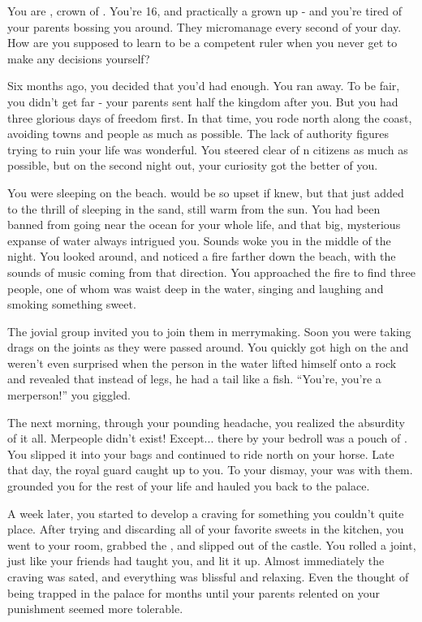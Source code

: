 \documentclass[char]{NeptuneBall}
\begin{document}
\name{\cWillow{}}
%

You are \cWillow{}, crown \cWillow{\prince} of \pAmerica{}. You're 16, and practically a grown up - and you're tired of your parents bossing you around. They micromanage every second of your day. How are you supposed to learn to be a competent ruler when you never get to make any decisions yourself?

Six months ago, you decided that you'd had enough. You ran away. To be fair, you didn't get far - your parents sent half the kingdom after you. But you had three glorious days of freedom first. In that time, you rode north along the coast, avoiding towns and people as much as possible. The lack of authority figures trying to ruin your life was wonderful. You steered clear of \pAmerica{}n citizens as much as possible, but on the second night out, your curiosity got the better of you.

You were sleeping on the beach. \cAriel{\Parent} would  be so upset if \cAriel{\they} knew, but that just added to the thrill of sleeping in the sand, still warm from the sun. You had been banned from going near the ocean for your whole life, and that big, mysterious expanse of water always intrigued you. Sounds woke you in the middle of the night. You looked around, and noticed a fire farther down the beach, with the sounds of music coming from that direction. You approached the fire to find three people, one of whom was waist deep in the water, singing and laughing and smoking something sweet.

The jovial group invited you to join them in merrymaking. Soon you were taking drags on the joints as they were passed around. You quickly got high on the \iDrug{\MYname} and weren't even surprised when the person in the water lifted himself onto a rock and revealed that instead of legs, he had a tail like a fish. ``You're, you're a merperson!'' you giggled.

The next morning, through your pounding headache, you realized the absurdity of it all. Merpeople didn't exist! Except... there by your bedroll was a pouch of \iDrug{\MYname}. You slipped it into your bags and continued to ride north on your horse. Late that day, the royal guard caught up to you. To your dismay, your \cAriel{\parent} was with them. \cAriel{} grounded you for the rest of your life and hauled you back to the palace.

A week later, you started to develop a craving for something you couldn't quite place. After trying and discarding all of your favorite sweets in the kitchen, you went to your room, grabbed the \iDrug{\MYname}, and slipped out of the castle.  You rolled a joint, just like your friends had taught you, and lit it up. Almost immediately the craving was sated, and everything was blissful and relaxing. Even the thought of being trapped in the palace for months until your parents relented on your punishment seemed more tolerable.
\end{document}
